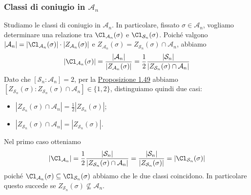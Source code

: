 \documentclass[11pt]{scrartcl}
\begin{document}
	\subsubsection{Classi di coniugio in $\mathcal{A}_n$}
	
	Studiamo le classi di coniugio in $\mathcal{A}_n$. In particolare,
	fissato $\sigma \in \mathcal{A}_n$, vogliamo determinare una relazione tra
	$\Cl_{\mathcal{A}_n}(\sigma)$ e $\Cl_{\mathcal{S}_n}(\sigma)$.
	Poiché valgono $|\mathcal{A}_n| = |\Cl_{\mathcal{A}_n}(\sigma)|\cdot |Z_{\mathcal{A}_n}(\sigma)|$
	e $Z_{\mathcal{A}_n}(\sigma) = Z_{\mathcal{S}_n}(\sigma) \cap \mathcal{A}_n$, abbiamo
	\[
	|\Cl_{\mathcal{A}_n}(\sigma)| = \frac{|\mathcal{A}_n|}{|Z_{\mathcal{A}_n}(\sigma)|} =
	\frac 1 2 \frac{|\mathcal{S}_n|}{|Z_{\mathcal{S}_n}(\sigma) \cap \mathcal{A}_n|}
	\]
	Dato che $[\mathcal{S}_n:\mathcal{A}_n] = 2$, per la \hyperref[prop1.49]{Proposizione 1.49}
	abbiamo $[Z_{\mathcal{S}_n}(\sigma):Z_{\mathcal{S}_n}(\sigma) \cap \mathcal{A}_n] \in \{1, 2\}$,
	distinguiamo quindi due casi:
	\begin{itemize}
		\item $|Z_{\mathcal{S}_n}(\sigma) \cap \mathcal{A}_n| = \displaystyle\frac 1 2 |Z_{\mathcal{S}_n}(\sigma)|$;
		\item $|Z_{\mathcal{S}_n}(\sigma) \cap \mathcal{A}_n| = |Z_{\mathcal{S}_n}(\sigma)|$.
	\end{itemize}
	
	Nel primo caso otteniamo 
	\[
	|\Cl_{\mathcal{A}_n}| = \frac 1 2 \frac{|\mathcal{S}_n|}{|Z_{\mathcal{S}_n}(\sigma) \cap \mathcal{A}_n|} =
	\frac{|\mathcal{S}_n|}{|Z_{\mathcal{S}_n}(\sigma)|} = |\Cl_{\mathcal{S}_n}(\sigma)|
	\]
	poiché $\Cl_{\mathcal{A}_n}(\sigma)\subseteq \Cl_{\mathcal{S}_n}(\sigma)$ abbiamo che le
	due classi coincidono. In particolare questo succede se $Z_{\mathcal{S}_n}(\sigma)
	\nsubseteq \mathcal{A}_n$.
	
\end{document}

